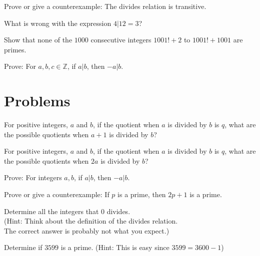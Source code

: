\begin{exer}
Prove or give a counterexample: The divides relation is transitive.
\end{exer}

\begin{exer}
What is wrong with the expression $4|12 = 3$?
\end{exer}

\begin{exer}
Show that none of the $1000$ consecutive integers $1001! + 2$ to $1001!+1001$ are primes.
\end{exer}

\begin{exer}
 Prove: For $a,b,c\in \mathbb{Z}$, if $a|b$, then $-a|b$.
\end{exer}

\section{Problems}

\begin{prob}
For positive integers, $a$ and $b$, if the quotient when $a$ is divided by $b$ is $q$,
what are the possible quotients when $a+1$ is divided by $b$?
\end{prob}

\begin{prob}
For positive integers, $a$ and $b$, if the quotient when $a$ is divided by $b$ is $q$,
what are the possible quotients when $2a$ is divided by $b$?
\end{prob}

\begin{prob}
Prove: For integers $a,b$, if $a|b$, then $-a|b$.
\end{prob}

\begin{prob}
 Prove or give a counterexample: If $p$ is a prime, then $2p+1$ is a prime.
\end{prob}

\begin{prob} 
Determine all the integers that $0$ divides. \\
(Hint: Think about the definition of the divides relation.\\
The correct answer is probably not what you expect.)
\end{prob}

\begin{prob}
Determine if $3599$ is a prime. (Hint: This is easy since $3599 = 3600 - 1$)
\end{prob}


